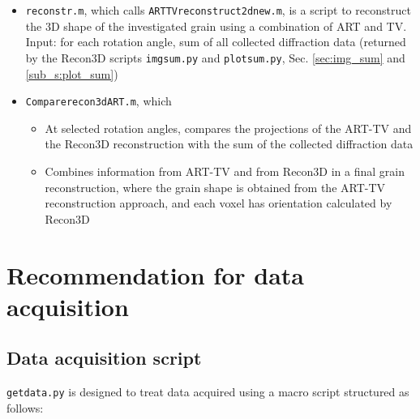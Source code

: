 \documentclass[11pt]{scrartcl}
\begin{document}
\begin{itemize}
    \item {\texttt{reconstr.m}}, which calls {\texttt{ART\textunderscore TV\textunderscore reconstruct\textunderscore 2d\textunderscore new.m}}, is a script to reconstruct the 3D shape of the investigated grain using a combination of {\footnotesize{ART}} and {\footnotesize{TV}}. Input: for each rotation angle, sum of all collected diffraction data (returned by the Recon3D scripts {\texttt{img\textunderscore sum.py}} and {\texttt{plot\textunderscore sum.py}}, Sec. \ref{sec:img_sum} and \ref{sub_s:plot_sum})
    \item {\texttt{Compare\textunderscore recon3d\textunderscore ART.m}}, which 
    \begin{itemize}
        \item At selected rotation angles, compares the projections of the {\footnotesize{ART-TV}} and the Recon3D reconstruction with the sum of the collected diffraction data
        \item Combines information from {\footnotesize{ART-TV}} and from Recon3D in a final grain reconstruction, where the grain shape is obtained from the {\footnotesize{ART-TV}} reconstruction approach, and each voxel has orientation calculated by Recon3D
    \end{itemize}
\end{itemize}

\section{Recommendation for data acquisition}\label{sec:data_acquisition}

\subsection{Data acquisition script}

{\texttt{getdata.py}} is designed to treat data acquired using a macro script structured as follows:
\end{document}

